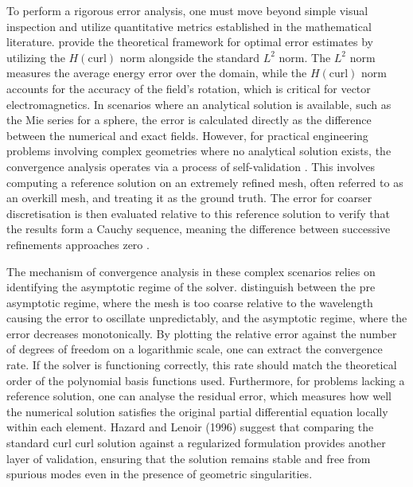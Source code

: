 \documentclass[class=report, crop=false]{standalone}
\begin{document}
\vspace{12pt}

To perform a rigorous error analysis, one must move beyond simple visual inspection and utilize quantitative metrics established in the mathematical literature. \citet{Zhong2018} provide the theoretical framework for optimal error estimates by utilizing the $H(\text{curl})$ norm alongside the standard $L^2$ norm. The $L^2$ norm measures the average energy error over the domain, while the $H(\text{curl})$ norm accounts for the accuracy of the field's rotation, which is critical for vector electromagnetics. In scenarios where an analytical solution is available, such as the Mie series for a sphere, the error is calculated directly as the difference between the numerical and exact fields. However, for practical engineering problems involving complex geometries where no analytical solution exists, the convergence analysis operates via a process of self-validation \citep{Esterhazy2013}. This involves computing a reference solution on an extremely refined mesh, often referred to as an overkill mesh, and treating it as the ground truth. The error for coarser discretisation is then evaluated relative to this reference solution to verify that the results form a Cauchy sequence, meaning the difference between successive refinements approaches zero \citep{Grand2020-we}.

\vspace{12pt}

The mechanism of convergence analysis in these complex scenarios relies on identifying the asymptotic regime of the solver. \citet{Frelet2024} distinguish between the pre asymptotic regime, where the mesh is too coarse relative to the wavelength causing the error to oscillate unpredictably, and the asymptotic regime, where the error decreases monotonically. By plotting the relative error against the number of degrees of freedom on a logarithmic scale, one can extract the convergence rate. If the solver is functioning correctly, this rate should match the theoretical order of the polynomial basis functions used. Furthermore, for problems lacking a reference solution, one can analyse the residual error, which measures how well the numerical solution satisfies the original partial differential equation locally within each element. Hazard and Lenoir (1996) suggest that comparing the standard curl curl solution against a regularized formulation provides another layer of validation, ensuring that the solution remains stable and free from spurious modes even in the presence of geometric singularities.
\end{document}

